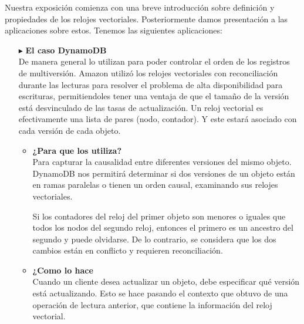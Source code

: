 Nuestra exposición comienza con una breve introducción sobre definición y
propiedades de los relojes vectoriales. Posteriormente damos presentación
a las aplicaciones sobre estos. Tenemos las siguientes aplicaciones:
\begin{itemize} 
\item [$\blacktriangleright$]{\bf El caso DynamoDB}\\

De manera general lo utilizan para poder controlar el orden de los registros
de multiversión. Amazon utilizó los relojes vectoriales con reconciliación 
durante las lecturas para resolver el problema de alta disponibilidad para 
escrituras, permitiendoles tener una ventaja de que el tamaño de la versión 
está desvinculado de las tasas de actualización. Un reloj vectorial es 
efectivamente una lista de pares (nodo, contador). Y este estará asociado 
con cada versión de cada objeto.

\begin{itemize}
\item {\bf ¿Para que los utiliza?}\\
Para capturar la causalidad entre diferentes versiones del mismo objeto.
DynamoDB nos permitirá determinar si dos versiones de un objeto están en ramas 
paralelas o tienen un orden causal, examinando sus relojes vectoriales.

Si los contadores del reloj del primer objeto son menores o iguales que todos
los nodos del segundo reloj, entonces el primero es un ancestro del segundo y
puede olvidarse. De lo contrario, se considera que los dos cambios están en
conflicto y requieren reconciliación.

\item {\bf ¿Como lo hace}\\
Cuando un cliente desea actualizar un objeto, debe especificar qué versión está
actualizando. Esto se hace pasando el contexto que obtuvo de una operación de
lectura anterior, que contiene la información del reloj vectorial.\\


\end{itemize}
\end{itemize}
